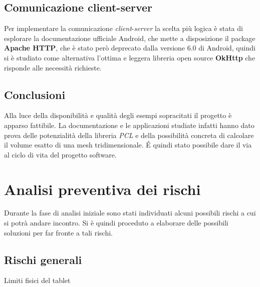 \subsection{Comunicazione client-server}
Per implementare la comunicazione \emph{client}-\emph{server} la scelta più logica è stata di esplorare la documentazione ufficiale Android, che mette a disposizione il package \textbf{Apache HTTP}\cite{site:apache}, che è stato però deprecato dalla versione 6.0 di Android, quindi si è studiato come alternativa l'ottima e leggera libreria open source \textbf{OkHttp}\cite{site:okhttp} che risponde alle necessità richieste.

\subsection{Conclusioni}
Alla luce della disponibilità e qualità degli esempi sopracitati il progetto è apparso fattibile. La documentazione e le applicazioni studiate infatti hanno dato prova delle potenzialità della libreria \emph{PCL} e della possibilità concreta di calcolare il volume esatto di una mesh tridimensionale. \'E quindi stato possibile dare il via al ciclo di vita del progetto software.


\newpage
\section{Analisi preventiva dei rischi}

Durante la fase di analisi iniziale sono stati individuati alcuni possibili rischi a cui si potrà andare incontro.
Si è quindi proceduto a elaborare delle possibili soluzioni per far fronte a tali rischi.\\

\subsection{Rischi generali}

\begin{risk}{Limiti fisici del tablet}
    \label{risk:device-limits} 
\end{risk}

